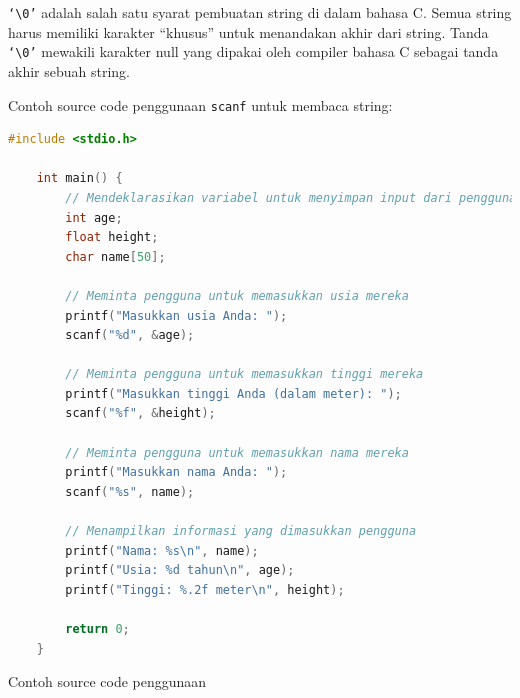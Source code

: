 \verb|‘\0’| adalah salah satu syarat pembuatan string di dalam bahasa C. 
Semua string harus memiliki karakter “khusus” untuk menandakan akhir dari string. 
Tanda \verb|‘\0’| mewakili karakter null yang dipakai oleh compiler bahasa C sebagai tanda akhir sebuah string.

Contoh source code penggunaan \verb|scanf| untuk membaca string:
\begin{lstlisting}[language=c,caption = Contoh String dengan scanf,label=lst:array1d01]
	#include <stdio.h>

	int main() {
		// Mendeklarasikan variabel untuk menyimpan input dari pengguna
		int age;
		float height;
		char name[50];

		// Meminta pengguna untuk memasukkan usia mereka
		printf("Masukkan usia Anda: ");
		scanf("%d", &age);
		
		// Meminta pengguna untuk memasukkan tinggi mereka
		printf("Masukkan tinggi Anda (dalam meter): ");
		scanf("%f", &height);
		
		// Meminta pengguna untuk memasukkan nama mereka
		printf("Masukkan nama Anda: ");
		scanf("%s", name);

		// Menampilkan informasi yang dimasukkan pengguna
		printf("Nama: %s\n", name);
		printf("Usia: %d tahun\n", age);
		printf("Tinggi: %.2f meter\n", height);

		return 0;
	}
\end{lstlisting}

Contoh source code penggunaan 
